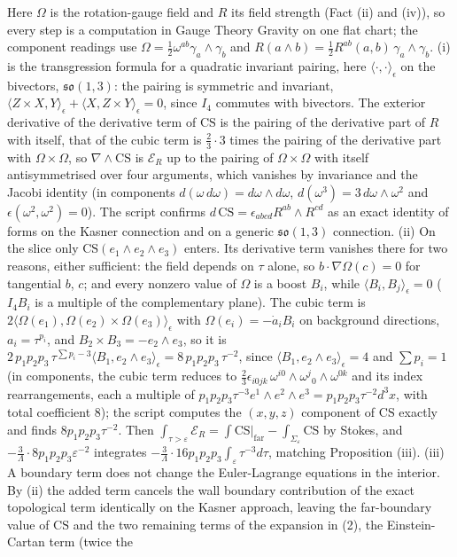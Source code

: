 Here $\Omega$ is the rotation-gauge field and $R$ its field strength (Fact (ii) and (iv)), so every step is a computation in Gauge Theory Gravity on one flat chart; the component readings use $\Omega = \tfrac12\omega^{ab}\gamma_a\wedge\gamma_b$ and $R(a\wedge b) = \tfrac12 R^{ab}(a, b)\,\gamma_a\wedge\gamma_b$. (i) is the transgression formula for a quadratic invariant pairing, here $\langle\cdot,\cdot\rangle_{\epsilon}$ on the bivectors, $\mathfrak{so}(1,3)$: the pairing is symmetric and invariant, $\langle Z\times X, Y\rangle_{\epsilon} + \langle X, Z\times Y\rangle_{\epsilon} = 0$, since $I_4$ commutes with bivectors. The exterior derivative of the derivative term of $\mathrm{CS}$ is the pairing of the derivative part of $R$ with itself, that of the cubic term is $\tfrac23\cdot 3$ times the pairing of the derivative part with $\Omega\times\Omega$, so $\nabla\wedge\mathrm{CS}$ is $\mathcal{E}_{R}$ up to the pairing of $\Omega\times\Omega$ with itself antisymmetrised over four arguments, which vanishes by invariance and the Jacobi identity (in components $d(\omega\,d\omega) = d\omega\wedge d\omega$, $d(\omega^3) = 3\,d\omega\wedge\omega^2$ and $\epsilon(\omega^2,\omega^2) = 0$). The script confirms $d\,\mathrm{CS} = \epsilon_{abcd}R^{ab}\wedge R^{cd}$ as an exact identity of forms on the Kasner connection and on a generic $\mathfrak{so}(1,3)$ connection. (ii) On the slice only $\mathrm{CS}(e_1\wedge e_2\wedge e_3)$ enters. Its derivative term vanishes there for two reasons, either sufficient: the field depends on $\tau$ alone, so $b\cdot\nabla\Omega(c) = 0$ for tangential $b$, $c$; and every nonzero value of $\Omega$ is a boost $B_i$, while $\langle B_i, B_j\rangle_{\epsilon} = 0$ ($I_4B_i$ is a multiple of the complementary plane). The cubic term is $2\langle\Omega(e_1), \Omega(e_2)\times\Omega(e_3)\rangle_{\epsilon}$ with $\Omega(e_i) = -\dot a_iB_i$ on background directions, $a_i = \tau^{p_i}$, and $B_2\times B_3 = -e_2\wedge e_3$, so it is $2\,p_1p_2p_3\,\tau^{\sum p_i - 3}\langle B_1, e_2\wedge e_3\rangle_{\epsilon} = 8\,p_1p_2p_3\,\tau^{-2}$, since $\langle B_1, e_2\wedge e_3\rangle_{\epsilon} = 4$ and $\sum p_i = 1$ (in components, the cubic term reduces to $\tfrac23\epsilon_{i0jk}\,\omega^{i0}\wedge\omega^{j}{}_{0}\wedge\omega^{0k}$ and its index rearrangements, each a multiple of $p_1p_2p_3\tau^{-3}e^1\wedge e^2\wedge e^3 = p_1p_2p_3\tau^{-2}d^3x$, with total coefficient $8$); the script computes the $(x,y,z)$ component of $\mathrm{CS}$ exactly and finds $8p_1p_2p_3\tau^{-2}$. Then $\int_{\tau>\varepsilon}\mathcal{E}_{R} = \int \mathrm{CS}\big|_{\text{far}} - \int_{\Sigma_\varepsilon}\mathrm{CS}$ by Stokes, and $-\tfrac3\Lambda\cdot 8p_1p_2p_3\varepsilon^{-2}$ integrates $-\tfrac{3}{\Lambda}\cdot 16 p_1p_2p_3\int_\varepsilon\tau^{-3}d\tau$, matching Proposition (iii). (iii) A boundary term does not change the Euler-Lagrange equations in the interior. By (ii) the added term cancels the wall boundary contribution of the exact topological term identically on the Kasner approach, leaving the far-boundary value of $\mathrm{CS}$ and the two remaining terms of the expansion in (2), the Einstein-Cartan term (twice the 